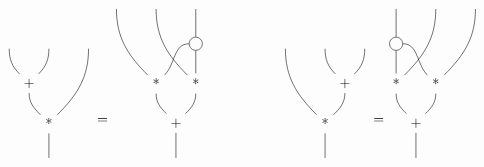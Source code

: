 \begin{displaymath}
  \begin{matrix}
    \begin{tikzpicture}[baseline]
      \path
      (-1,2) node(x) {}
      (0,2) node(y) {}
      (-0.5,1) node(+) {+}
      (1,2) node(z) {}
      (0,0) node(*) {*}
      (0,-1) node(res) {}
      ;

      \draw (x) to[out=270,in=135] (+);
      \draw (y) to[out=270,in=45] (+);
      \draw (+) to[out=270,in=135] (*);
      \draw (z) to[out=270,in=45] (*);
      \draw (*) -- (res);
    \end{tikzpicture}
    =
    \begin{tikzpicture}[baseline]
      \path
      (-2,3) node(x) {}
      (-1,3) node(y) {}
      (0,3) node(z) {}
      (0,2) node[circle,draw](dup) {}
      (-1,1) node(x*) {*}
      (0,1) node(y*) {*}
      (-0.5,0) node(+) {+}
      (-0.5,-1) node(res) {}
      ;

      \draw (z) -- (dup);
      \draw (x) to[out=270,in=135] (x*);
      \draw (y) to[out=270,in=135] (y*);
      \draw (dup) to[out=180,in=45] (x*);
      \draw (dup) -- (y*);
      \draw (x*) to[out=270,in=135] (+);
      \draw (y*) to[out=270,in=45] (+);
      \draw (+) -- (res);
    \end{tikzpicture}
    &\phantom{mmmm}&
    \begin{tikzpicture}[baseline]
      \path
      (1,2) node(x) {}
      (0,2) node(y) {}
      (0.5,1) node(+) {+}
      (-1,2) node(z) {}
      (0,0) node(*) {*}
      (0,-1) node(res) {}
      ;

      \draw (x) to[out=270,in=45] (+);
      \draw (y) to[out=270,in=135] (+);
      \draw (+) to[out=270,in=45] (*);
      \draw (z) to[out=270,in=135] (*);
      \draw (*) -- (res);
    \end{tikzpicture}
    =
    \begin{tikzpicture}[baseline]
      \path
      (2,3) node(x) {}
      (1,3) node(y) {}
      (0,3) node(z) {}
      (0,2) node[circle,draw](dup) {}
      (1,1) node(x*) {*}
      (0,1) node(y*) {*}
      (0.5,0) node(+) {+}
      (0.5,-1) node(res) {}
      ;

      \draw (z) -- (dup);
      \draw (x) to[out=270,in=45] (x*);
      \draw (y) to[out=270,in=45] (y*);
      \draw (dup) to[out=0,in=135] (x*);
      \draw (dup) -- (y*);
      \draw (x*) to[out=270,in=45] (+);
      \draw (y*) to[out=270,in=135] (+);
      \draw (+) -- (res);
    \end{tikzpicture}
  \end{matrix}
\end{displaymath}

